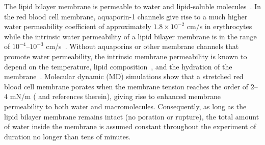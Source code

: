 \documentclass[prb,preprint,showpacs,preprintnumbers,amsmath,amssymb,longbibliography]{revtex4-1}
\begin{document}
The lipid bilayer membrane is permeable to water and lipid-soluble
molecules~\cite{Dick1964_JTB, FettiplaceHaydon1980_PhysRev,
DeamerBramhall1986_ChemPhysLipids, Grafmueller2019_ABLS}. 
%
%
In the red blood cell membrane, aquaporin-1 channels give rise to a much
higher water permeability coefficient of approximately $1.8\times 10^{-2}$ cm/s in
erythrocytes~\cite{YangMaVerkman2001_JBC} while the intrinsic water
permeability of a lipid bilayer membrane is in the range of
$10^{-4}$--$10^{-3}$ cm/s~\cite{ThompsonHuang1966_ANYAS,
FettiplaceHaydon1980_PhysRev, Grafmueller2019_ABLS, Dimova2020_GVB,
BhatiaRobinsonDimova2020_SoftMatt}. 
Without aquaporins or other membrane channels that promote water
permeability, the intrinsic membrane permeability is known to depend on the
temperature, lipid composition~\cite{OlbrichRawiczNeedhamEtAl2000_BJ},
and the hydration of the membrane~\cite{MarrinkBerendsen1994_JPhysChem}.
%
Molecular dynamic (MD) simulations show that a stretched red blood cell
membrane porates when the membrane tension reaches the order of $2$--$4$
mN/m (\cite{RazizadehNikfarPaulLiu2020_BJ} and references therein),
giving rise to enhanced membrane permeability to both water and
macromolecules. Consequently, as long as the lipid bilayer membrane
remains intact (no poration or rupture), the total amount of water inside the membrane 
is assumed constant throughout the experiment of duration
no longer than tens of minutes.
%
\end{document}
